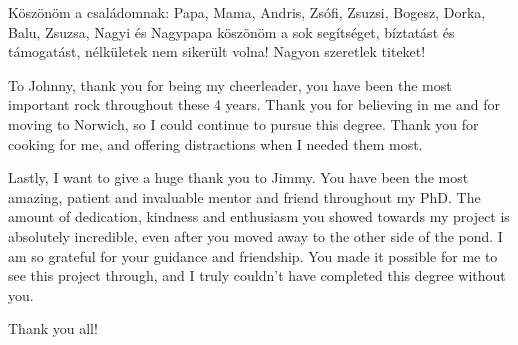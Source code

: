 \begin{acknowledgements}
Köszönöm a családomnak: Papa, Mama, Andris, Zsófi, Zsuzsi, Bogesz, Dorka, Balu, Zsuzsa, Nagyi és Nagypapa köszönöm a sok segítséget, bíztatást és támogatást, nélkületek nem sikerült volna! Nagyon szeretlek titeket!

To Johnny, thank you for being my cheerleader, you have been the most important rock throughout these 4 years. Thank you for believing in me and for moving to Norwich, so I could continue to pursue this degree. Thank you for cooking for me, and offering distractions when I needed them most.

Lastly, I want to give a huge thank you to Jimmy. You have been the most amazing, patient and invaluable mentor and friend throughout my PhD. The amount of dedication, kindness and enthusiasm you showed towards my project is absolutely incredible, even after you moved away to the other side of the pond. I am so grateful for your guidance and friendship. You made it possible for me to see this project through, and I truly couldn’t have completed this degree without you.

Thank you all!


\end{acknowledgements}
